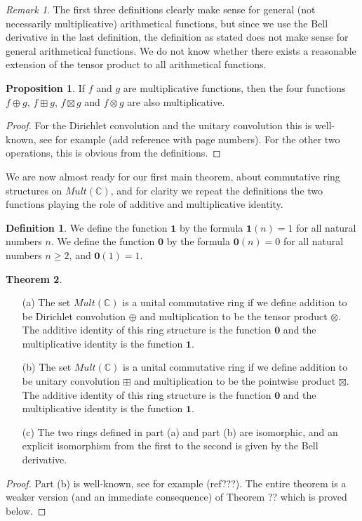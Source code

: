 \documentclass[a4paper]{article}
\theoremstyle{definition}
\newtheorem{theorem}{Theorem}[section]
\newtheorem{definition}{Definition}[section]
\newtheorem{proposition}[theorem]{Proposition}
\theoremstyle{remark}
\newtheorem*{remark}{Remark}
\begin{document}
\begin{remark}
The first three definitions clearly make sense for general (not necessarily multiplicative) arithmetical functions, but since we use the Bell derivative in the last definition, the definition as stated does not make sense for general arithmetical functions. We do not know whether there exists a reasonable extension of the tensor product to all arithmetical functions.
\end{remark}

\begin{proposition}
If $f$ and $g$ are multiplicative functions, then the four functions $f \oplus g$, $f \boxplus g$, $f \boxtimes g$ and $f \otimes g$ are also multiplicative. 
\end{proposition}

\begin{proof}
For the Dirichlet convolution and the unitary convolution this is well-known, see for example (add reference with page numbers). For the other two operations, this is obvious from the definitions.
\end{proof}

We are now almost ready for our first main theorem, about commutative ring structures on $Mult(\mathbb{C})$, and for clarity we repeat the definitions the two functions playing the role of additive and multiplicative identity.

\begin{definition}
We define the function $\mathbf{1}$ by the formula $\mathbf{1}(n) = 1$ for all natural numbers $n$. We define the function $\mathbf{0}$ by the formula $\mathbf{0}(n) = 0$ for all natural numbers $n \geq 2$, and $\mathbf{0}(1) = 1$.
\end{definition}



\begin{theorem}
\begin{itemize}
\item[(a)] The set $Mult(\mathbb{C})$ is a unital commutative ring if we define addition to be Dirichlet convolution $\oplus$ and multiplication to be the tensor product $\otimes$. The additive identity of this ring structure is the function $\mathbf{0}$ and the multiplicative identity is the function $\mathbf{1}$. 
\item[(b)] The set $Mult(\mathbb{C})$ is a unital commutative ring if we define addition to be unitary convolution $\boxplus$ and multiplication to be the pointwise product $\boxtimes$. The additive identity of this ring structure is the function $\mathbf{0}$ and the multiplicative identity is the function $\mathbf{1}$.
\item[(c)] The two rings defined in part (a) and part (b) are isomorphic, and an explicit isomorphism from the first to the second is given by the Bell derivative. 
\end{itemize}
\end{theorem}
\begin{proof}
Part (b) is well-known, see for example (ref???). The entire theorem is a weaker version (and an immediate consequence) of Theorem ?? which is proved below.
\end{proof}
\end{document}
